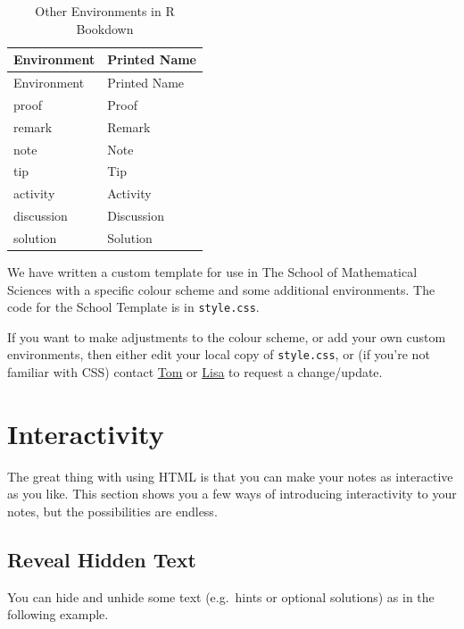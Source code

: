 \documentclass[
]{article}
\numberwithin{equation}{section}
\numberwithin{figure}{section}
\theoremstyle{break}
\theoremstyle{definition}
\theoremstyle{definition}
\theoremstyle{definition}
\theoremstyle{definition}
\theoremstyle{remark}
\begin{document}
\begin{longtable}[]{@{}ll@{}}
\caption{\label{tab:oth-envs} Other Environments in R Bookdown}\tabularnewline
\toprule\noalign{}
Environment & Printed Name \\
\midrule\noalign{}
\endfirsthead
\toprule\noalign{}
Environment & Printed Name \\
\midrule\noalign{}
\endhead
\bottomrule\noalign{}
\endlastfoot
proof & Proof \\
remark & Remark \\
note & Note \\
tip & Tip \\
activity & Activity \\
discussion & Discussion \\
solution & Solution \\
\end{longtable}

We have written a custom template for use in The School of Mathematical Sciences with a specific colour scheme and some additional environments. The code for the School Template is in \texttt{style.css}.

If you want to make adjustments to the colour scheme, or add your own custom environments, then either edit your local copy of \texttt{style.css}, or (if you're not familiar with CSS) contact \href{mailto:tom.wicks@nottingham.ac.uk}{Tom} or \href{mailto:lisa.mott@nottingham.ac.uk}{Lisa} to request a change/update.

\hypertarget{interactivity}{%
\section{Interactivity}\label{interactivity}}

The great thing with using HTML is that you can make your notes as interactive as you like. This section shows you a few ways of introducing interactivity to your notes, but the possibilities are endless.

\hypertarget{reveal-hidden-text}{%
\subsection{Reveal Hidden Text}\label{reveal-hidden-text}}

You can hide and unhide some text (e.g.~hints or optional solutions) as in the following example.
\end{document}
